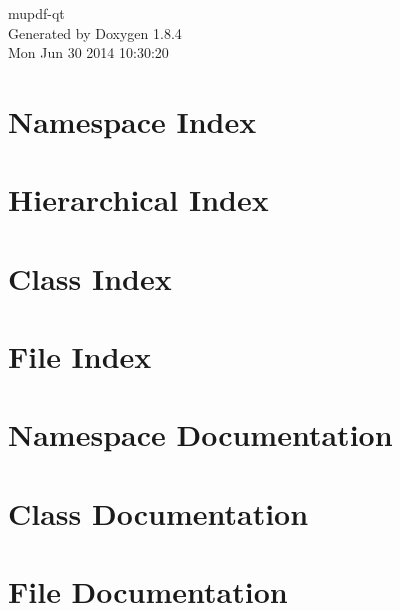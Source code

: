 \documentclass[twoside]{book}
\newcommand{\clearemptydoublepage}{%
  \newpage{\pagestyle{empty}\cleardoublepage}%
}
\begin{document}
\hypersetup{pageanchor=false}
\begin{titlepage}
\vspace*{7cm}
\begin{center}%
{\Large mupdf-\/qt }\\
\vspace*{1cm}
{\large Generated by Doxygen 1.8.4}\\
\vspace*{0.5cm}
{\small Mon Jun 30 2014 10:30:20}\\
\end{center}
\end{titlepage}
\clearemptydoublepage
\tableofcontents
\clearemptydoublepage
{}
\hypersetup{pageanchor=true}

\chapter{Namespace Index}

\chapter{Hierarchical Index}

\chapter{Class Index}

\chapter{File Index}

\chapter{Namespace Documentation}

\chapter{Class Documentation}











\chapter{File Documentation}












\newpage
{}
{}
\printindex
\end{document}
